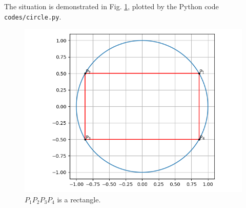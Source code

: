 \documentclass[journal,12pt,twocolumn]{IEEEtran}
\begin{document}
\begin{enumerate}
    The situation is demonstrated in Fig. \ref{fig:circle}, plotted by the Python
    code \texttt{codes/circle.py}.
    \begin{figure}[!ht]
        \centering
        \includegraphics[width=\columnwidth]{figs/circle.png}
        \caption{$P_1P_2P_3P_4$ is a rectangle.}
        \label{fig:circle}
    \end{figure}
\end{enumerate}
\end{document}
